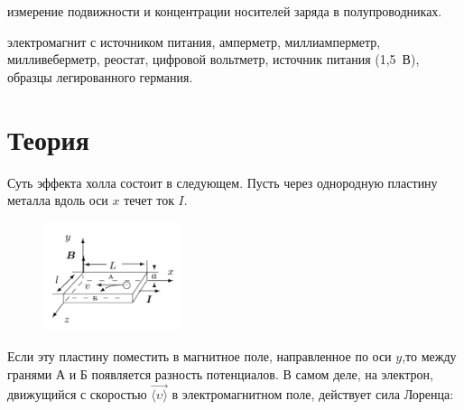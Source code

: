 \documentclass[a4paper,14pt]{article}
\begin{document}
\author{Рябых Владислав и Исыпов Илья, Б05-905}
\title{}
\maketitle

 измерение подвижности и концентрации носителей заряда в полупроводниках.

 электромагнит с источником питания, амперметр, миллиамперметр, милливеберметр, реостат, цифровой вольтметр, источник питания (1,5~В), образцы легированного германия.


\section*{Теория}

Суть эффекта холла состоит в следующем. Пусть через однородную пластину металла вдоль оси $x$ течет ток $I$.

\begin{figure}
	\includegraphics[width =0.36\textwidth]{theory_1.png}
	\newline
\end{figure}


Если эту пластину поместить в магнитное поле, направленное по оси $y$,то между гранями А и Б появляется разность потенциалов. В самом деле, на электрон, движущийся с скоростью $\Vec{\langle\upsilon\rangle}$ в электромагнитном поле, действует сила Лоренца:
\end{document}
